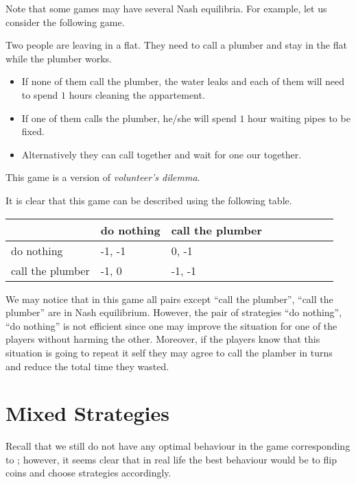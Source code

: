 Note that some games may have several Nash equilibria. For example, let us
consider the following game.
\begin{game}
  Two people are leaving in a flat. They need to call a plumber and stay in the
  flat while the plumber works.
  \begin{itemize}
    \item If none of them call the plumber, the water leaks and each of them
      will need to spend $1$ hours cleaning the appartement.
    \item If one of them calls the plumber, he/she will spend $1$ hour waiting
      pipes to be fixed.
    \item Alternatively they can call together and wait for one our together.
  \end{itemize}
  This game is a version of \emph{volunteer's dilemma}.
\end{game}
It is clear that this game can be described using the following table.
\begin{center}
  \begin{tabular}{l l l  l  l  l  l  l  l}
    \toprule
                       & do nothing  & call the plumber   \\
    \midrule
    do nothing         & -1, -1    & 0, -1    \\
    call the plumber   & -1, 0       & -1, -1   \\
    \bottomrule
  \end{tabular}
\end{center}
We may notice that in this game all pairs except ``call the plumber'', ``call the
plumber'' are in Nash equilibrium. However, the pair of strategies ``do
nothing'', ``do nothing'' is not efficient since one may improve the situation
for one of the players without harming the other. Moreover, if the players know
that this situation is going to repeat it self they may agree to call the
plamber in turns and reduce the total time they wasted. 

\section{Mixed Strategies}
Recall that we still do not have any optimal behaviour in the game corresponding
to ; however, it seems clear that in real life
the best behaviour would be to flip coins and choose strategies accordingly.

